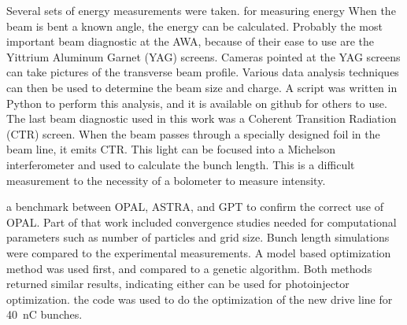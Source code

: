   Several sets of energy measurements were taken.  for measuring energy 
When the beam is bent  a known angle, the energy can be  calculated. 
Probably the most important beam diagnostic at the AWA, 
because of their ease to use are the Yittrium Aluminum Garnet (YAG) screens. 
Cameras pointed at the YAG screens can take pictures of the 
transverse beam profile. 
Various data analysis techniques can then be used to determine 
the beam size and charge. A script was written in Python
to perform this analysis, and it is available on github for others to use. 
The last beam diagnostic used in this work was a Coherent Transition Radiation (CTR) screen. When the beam passes
through a specially designed foil in the beam line, 
it emits CTR. This light can be focused into a Michelson 
interferometer and used to calculate the bunch length. 
This is a difficult measurement  to the necessity of  a 
bolometer to measure intensity. 

 a benchmark  between OPAL, ASTRA, and GPT 
to confirm the correct use of OPAL. 
Part of that work included convergence studies needed for computational parameters such as number of particles and grid size.
Bunch length simulations were compared to the experimental 
measurements. 
A model based optimization method was used first, 
and compared to a genetic algorithm. 
Both methods returned similar results, indicating either
can be used for photoinjector optimization.   the code was used to do the optimization of the new drive line for \SI{40}{nC} bunches.  

